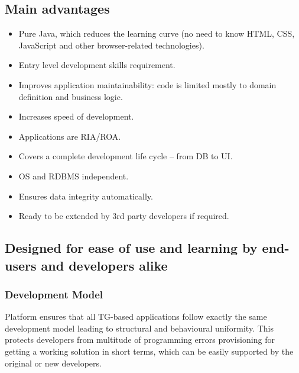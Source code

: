 \documentclass[a4paper,12pt,twocolumn,oneside,openright,final]{memoir}
\begin{document}
\subsection*{Main advantages}
  \begin{itemize}
    \item Pure Java, which reduces the learning curve (no need to know HTML, CSS, JavaScript and other browser-related technologies).
    \item Entry level development skills requirement.
    \item Improves application maintainability: code is limited mostly to domain definition and business logic.
    \item Increases speed of development.
    \item Applications are RIA/ROA.
    \item Covers a complete development life cycle -- from DB to UI.
    \item OS and RDBMS independent.
    \item Ensures data integrity automatically.
    \item Ready to be extended by 3rd party developers if required.
  \end{itemize}

\subsection*{Designed for ease of use and learning by end-users and developers alike}

\subsubsection*{Development Model}
  Platform ensures that all TG-based applications follow exactly the same development model leading to structural and behavioural uniformity.
  This protects developers from multitude of programming errors provisioning for getting a working solution in short terms, which can be easily supported by the original or new developers.
 
\end{document}
